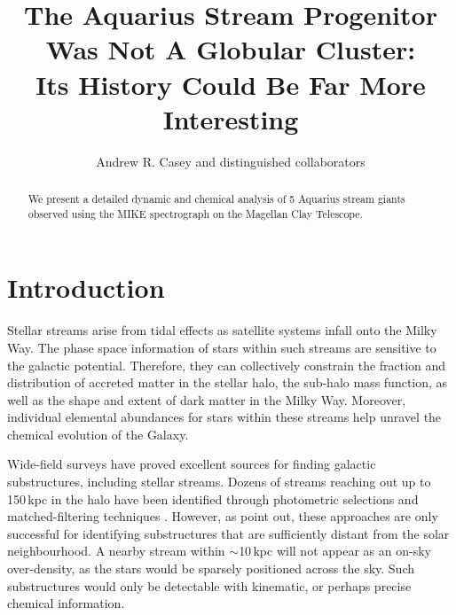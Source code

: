 \documentclass{emulateapj}
\begin{document}
\title{The Aquarius Stream Progenitor Was Not A Globular Cluster: \\ Its History Could Be Far More Interesting}


\author{Andrew R. Casey and distinguished collaborators}


\begin{abstract}
We present a detailed dynamic and chemical analysis of 5 Aquarius stream giants observed using the MIKE spectrograph on the Magellan Clay Telescope. 
\end{abstract}


\section{Introduction}

Stellar streams arise from tidal effects as satellite systems infall onto the Milky Way. The phase space information of stars within such streams are sensitive to the galactic potential. Therefore, they can collectively constrain the fraction and distribution of accreted matter in the stellar halo, the sub-halo mass function, as well as the shape and extent of dark matter in the Milky Way. Moreover, individual elemental abundances for stars within these streams help unravel the chemical evolution of the Galaxy. 

Wide-field surveys have proved excellent sources for finding galactic substructures, including stellar streams. Dozens of streams reaching out up to 150\,kpc in the halo have been identified through photometric selections and matched-filtering techniques \citep{belokurov;et-al_2007,koposov_SG1}. However, as \citet{helmi;white_1999} point out, these approaches are only successful for identifying substructures that are sufficiently distant from the solar neighbourhood. A nearby stream within $\sim{}$10\,kpc will not appear as an on-sky over-density, as the stars would be sparsely positioned across the sky. Such substructures would only be detectable with kinematic, or perhaps precise chemical information. 
\end{document}
